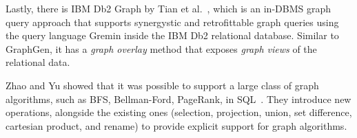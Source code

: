 Lastly, there is IBM Db2 Graph by Tian et al.~\cite{DBLP:conf/sigmod/TianXZPTSKAP20}, which is an in-DBMS graph query approach that supports synergystic and retrofittable graph queries using the query language Gremin inside the IBM Db2 relational database.
Similar to GraphGen, it has a \textit{graph overlay} method that exposes \textit{graph views} of the relational data.  

Zhao and Yu showed that it was possible to support a large class of graph algorithms, such as BFS, Bellman-Ford, PageRank, in SQL~\cite{DBLP:journals/debu/ZhaoY17}.
They introduce new operations, alongside the existing ones (selection, projection, union, set difference, cartesian product, and rename) to provide explicit support for graph algorithms. 